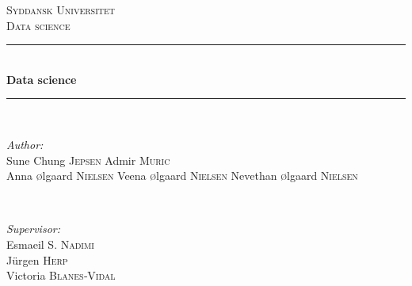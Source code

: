 \documentclass[a4paper]{report}
\theoremstyle{plain}
\begin{document}
\begin{titlepage}

\newcommand{\HRule}{\rule{\linewidth}{0.5mm}} %

\center %
 

\textsc{\LARGE Syddansk Universitet}\\[0.5cm] %
\textsc{\large Data science}\\[1.5cm] %



\HRule \\[0.4cm]
{ \huge \bfseries Data science}\\[0.4cm] %
\HRule \\[1.5cm]
 

\begin{minipage}{0.4\textwidth}
\begin{flushleft} \large
\emph{Author:}\\
Sune Chung \textsc{Jepsen} %
Admir \textsc{Muric}\\ %
Anna \textsc{\o}lgaard \textsc{Nielsen} %
Veena \textsc{\o}lgaard \textsc{Nielsen} %
Nevethan \textsc{\o}lgaard \textsc{Nielsen} %
\end{flushleft}
\end{minipage}
~
\begin{minipage}{0.4\textwidth}
\begin{flushright} \large
\emph{Supervisor:} \\
Esmaeil S.  \textsc{Nadimi}\\ %
Jürgen   \textsc{Herp} \\%
Victoria   \textsc{Blanes‐Vidal} %
\end{flushright}
\end{minipage}\\[2cm]


\end{titlepage}
\end{document}
